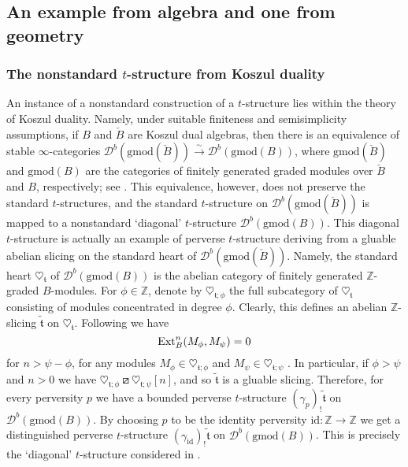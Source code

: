 \documentclass{article}
\theoremstyle{definition}
\newcommand{\Z}{\mathbb{Z}}
\newcommand{\tee}{\mathfrak{t}}
\newcommand{\orth}{\boxslash}
\begin{document}
\subsection{An example from algebra and one from geometry}

\subsubsection{The nonstandard $t$-structure from Koszul duality}


 An instance of a nonstandard construction of a $t$-structure lies within the theory of Koszul duality. Namely, under suitable finiteness and semisimplicity assumptions, if $B$ and $\check{B}$ are Koszul dual algebras, then there is an equivalence of stable $\infty$-categories $\mathscr{D}^b(\mathrm{gmod}(\check{B}))\xrightarrow{\sim}\mathscr{D}^b(\mathrm{gmod}({B}))$, where $\mathrm{gmod}(\check{B})$ and $\mathrm{gmod}({B})$ are the categories of finitely generated graded modules over $\check{B}$ and $B$, respectively; see \cite{kosz}. This equivalence, however, does not preserve the standard $t$-structures, and the standard $t$-structure on $\mathscr{D}^b(\mathrm{gmod}(\check{B}))$ is mapped to a nonstandard `diagonal' $t$-structure $\mathscr{D}^b(\mathrm{gmod}({B}))$. This diagonal $t$-structure is actually an example of perverse $t$-structure deriving from a gluable abelian slicing on the standard heart of $\mathscr{D}^b(\mathrm{gmod}(\check{B}))$. Namely, the standard heart $\heartsuit_\tee$ of $\mathscr{D}^b(\mathrm{gmod}({B}))$ is the abelian category of finitely generated $\Z$-graded $B$-modules. For $\phi \in \Z$, denote by $\heartsuit_{\tee;\phi}$ the full subcategory of $\heartsuit_{\tee}$ consisting of modules concentrated in degree $\phi$. Clearly, this defines an abelian $\Z$-slicing $\tilde{\tee}$ on $\heartsuit_{\tee}$. Following \cite{kosz} we have
  \[
  \textnormal{Ext}_{B}^n(M_{\phi},M_{\psi})=0
  \]
for $n>\psi - \phi$, for any modules $M_\phi\in\heartsuit_{\tee;\phi}$ and $M_\psi\in\heartsuit_{\tee;\psi}$ . In particular, if $\phi>\psi$ and $n>0$ we have  $\heartsuit_{\tee;\phi}\orth \heartsuit_{\tee;\psi}[n]$, and so
$\tilde{\tee}$ is a gluable slicing. Therefore, for every perversity $p$  we have a bounded perverse $t$-structure $(\gamma_p)_!\tilde{\tee}$ on $\mathscr{D}^b(\mathrm{gmod}({B}))$. By choosing $p$ to be the identity perversity $\mathrm{id}\colon \Z\to \Z$ we get a distinguished perverse $t$-structure $(\gamma_{\mathrm{id}})_!\tilde{\tee}$ on $\mathscr{D}^b(\mathrm{gmod}({B}))$. This is precisely the `diagonal' $t$-structure %
considered in \cite{kosz}. 
\end{document}

